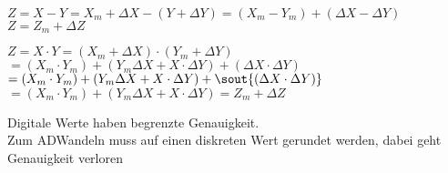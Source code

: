 \documentclass[letterpaper,10pt,english]{jupyterBook}
\begin{document}
\begin{DUlineblock}{0em}
\item[] 
\end{DUlineblock}

\sphinxAtStartPar
\(Z = X - Y = X_m + \Delta X - \left(Y + \Delta Y\right) = \left(X_m - Y_m\right) + \left(\Delta X - \Delta Y\right)\)\\
\(Z = Z_m + \Delta Z\)

\begin{DUlineblock}{0em}
\item[] 
\end{DUlineblock}

\sphinxAtStartPar
\(Z = X\cdot Y = \left(X_m + \Delta X\right) \cdot \left(Y_m + \Delta Y\right)\)\\
\(=\left(X_m \cdot Y_m\right) + \left(Y_m \Delta X + X \cdot \Delta Y\right) + \left(\Delta X \cdot \Delta Y\right)\)\\
\(=\left(X_m \cdot Y_m\right) + \left(Y_m \Delta X + X \cdot \Delta Y\right) + \sout{\left(\Delta X \cdot \Delta Y\right)}\)\\
\(=\left(X_m \cdot Y_m\right) + \left(Y_m \Delta X + X \cdot \Delta Y\right) = Z_m + \Delta Z\)

\begin{DUlineblock}{0em}
\item[] 
\end{DUlineblock}

\begin{DUlineblock}{0em}
\item[] 
\end{DUlineblock}

\sphinxAtStartPar
Digitale Werte haben begrenzte Genauigkeit.\\
Zum AD\sphinxhyphen{}Wandeln muss auf einen diskreten Wert gerundet werden,
dabei geht Genauigkeit verloren

\begin{DUlineblock}{0em}
\item[] 
\end{DUlineblock}

\begin{DUlineblock}{0em}
\item[] 
\end{DUlineblock}
\end{document}
